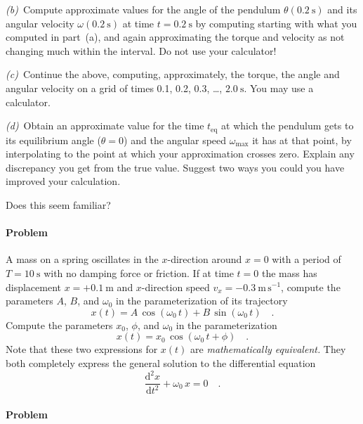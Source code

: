 \documentclass[12pt]{article}
\newcounter{problem}
\begin{document}
\textsl{(b)}~Compute approximate values for the angle of the pendulum
$\theta (0.2~\mathrm{s})$ and its angular velocity $\omega
(0.2~\mathrm{s})$ at time $t=0.2~\mathrm{s}$ by computing starting
with what you computed in part~(a), and again approximating the torque
and velocity as not changing much within the interval.  Do not use
your calculator!

\textsl{(c)}~Continue the above, computing, approximately, the torque,
the angle and angular velocity on a grid of times 0.1, 0.2, 0.3,
\ldots, $2.0~\mathrm{s}$.  You may use a calculator.

\textsl{(d)}~Obtain an approximate value for the time $t_\mathrm{eq}$
at which the pendulum gets to its equilibrium angle ($\theta=0$) and
the angular speed $\omega_\mathrm{max}$ it has at that point, by
interpolating to the point at which your approximation crosses zero.
Explain any discrepancy you get from the true value.  Suggest two ways
you could you have improved your calculation.

Does this seem familiar?

\paragraph{Problem~\theproblem}

A mass on a spring oscillates in the $x$-direction around $x=0$ with a
period of $T=10~\mathrm{s}$ with no damping force or friction.  If at
time $t=0$ the mass has displacement $x=+0.1~\mathrm{m}$ and
$x$-direction speed $v_x=-0.3~\mathrm{m\,s^{-1}}$, compute the
parameters $A$, $B$, and $\omega_0$ in the parameterization of its
trajectory
\begin{equation}
x(t) = A\,\cos(\omega_0\,t) + B\,\sin(\omega_0\,t) \quad .
\end{equation}
Compute the parameters $x_0$, $\phi$, and $\omega_0$ in the
parameterization
\begin{equation}
x(t) = x_0\,\cos (\omega_0\,t+\phi) \quad .
\end{equation}
Note that these two expressions for $x(t)$ are \emph{mathematically
equivalent.}  They both completely express the general solution to the
differential equation
\begin{equation}
\frac{\mathrm{d}^2x}{\mathrm{d}t^2}+\omega_0\,x=0 \quad .
\end{equation}

\paragraph{Problem~\theproblem}
\end{document}
